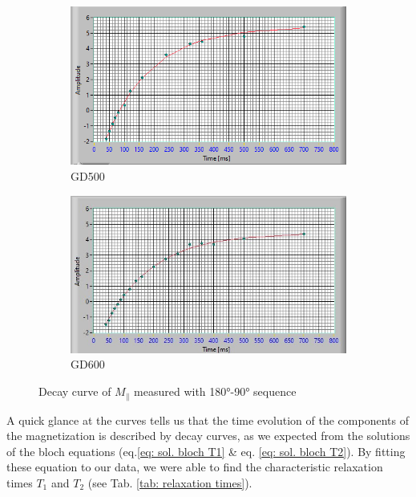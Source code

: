 \begin{figure}[!htbp]
  \centering
  \begin{subfigure}[b]{0.45\textwidth}
    \centering
    \includegraphics[width=\textwidth]{./Protocol images/GD500_T1 (1).png}
    \caption{GD500}
    \label{fig:GD500 T1}
  \end{subfigure}
  \hfill
  \begin{subfigure}[b]{0.45\textwidth}
    \centering
    \includegraphics[width=\textwidth]{./Protocol images/GD600_T1 (1).jpg}
    \caption{GD600}
    \label{fig:GD600 T1}
  \end{subfigure}
  \caption{Decay curve of $M_\parallel$ measured with 180°-90° sequence}
  \label{fig:subsidebyside}
\end{figure}
A quick glance at the curves tells us that the time evolution of the components of the magnetization is described by decay curves, as we expected from the solutions of the bloch equations (eq.\ref{eq: sol. bloch T1} \& eq. \ref{eq: sol. bloch T2}). By fitting these equation to our data, we were able to find the characteristic relaxation times $T_1$ and $T_2$ (see Tab. \ref{tab: relaxation times}).
